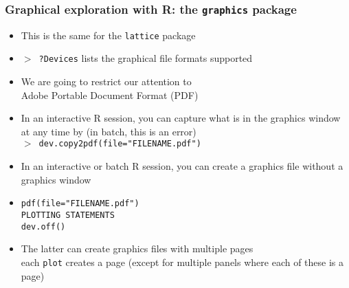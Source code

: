 \documentclass[11pt,pdftex,dvipsnames,usenames,helvetica]{beamer}
\begin{document}
\begin{frame}[fragile]
\frametitle{Graphical exploration with R: the {\tt graphics} package}
\begin{itemize}
\item This is the same for the {\tt lattice} package
\item {\tt $>$ ?Devices} lists the graphical file formats supported
\item We are going to restrict our attention to\\
 Adobe Portable Document Format (PDF)
\item In an interactive R session, you can capture what is in
the graphics window at any time by (in batch, this is an error)\\
{\tt $>$ dev.copy2pdf(file="FILENAME.pdf")}
\item In an interactive or batch R session, you can create 
a graphics file without a graphics window
\item
\begin{verbatim}
pdf(file="FILENAME.pdf")
PLOTTING STATEMENTS
dev.off()
\end{verbatim}
\item The latter can create graphics files with multiple pages\\
  each {\tt plot} creates a page (except for multiple panels where
  each of these is a page)
\end{itemize}
\end{frame}
\end{document}
